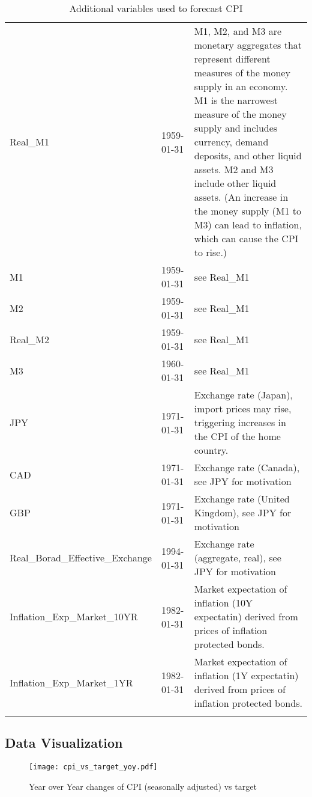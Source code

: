 \documentclass[12pt]{article}
\begin{document}
\begin{adjustwidth}{-2cm}{}
\begin{longtable}{llp{6cm}}
Real\_M1                             & 1959-01-31 & M1, M2, and M3 are monetary aggregates that represent different measures of the money supply in an economy. M1 is the narrowest measure of the money supply and includes currency, demand deposits, and other liquid assets. M2 and M3 include other liquid assets.  (An increase in the money supply (M1 to M3) can lead to inflation, which can cause the CPI to rise.)\\
M1                                     & 1959-01-31 & see Real\_M1\\
M2                           & 1959-01-31  & see Real\_M1 \\
Real\_M2                       & 1959-01-31 & see Real\_M1 \\
M3                                    & 1960-01-31  & see Real\_M1\\
JPY                                 & 1971-01-31 &  Exchange rate (Japan), import prices may rise, triggering increases in the CPI of the home country. \\
CAD                               & 1971-01-31 & Exchange rate (Canada), see JPY for motivation \\
GBP                                   & 1971-01-31  & Exchange rate (United Kingdom), see JPY for motivation \\
Real\_Borad\_Effective\_Exchange          & 1994-01-31 & Exchange rate (aggregate, real), see JPY for motivation \\
Inflation\_Exp\_Market\_10YR & 1982-01-31 & Market expectation of inflation (10Y expectatin) derived from prices of inflation protected bonds. \\
Inflation\_Exp\_Market\_1YR & 1982-01-31  & Market expectation of inflation (1Y expectatin) derived from prices of inflation protected bonds. \\

\bottomrule



\caption{Additional variables used to forecast CPI}
\label{table:motivation}
\end{longtable}
\end{adjustwidth}


\subsection{Data Visualization}


\begin{figure}[h]
    \centering
    \texttt{[image: cpi\_vs\_target\_yoy.pdf]}
    \caption{Year over Year changes of CPI (seasonally adjusted) vs target}
    \label{fig:cpi_vs_target_yoy}
\end{figure}
\end{document}
